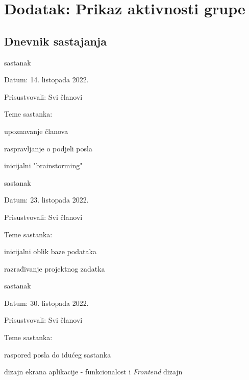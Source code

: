 \chapter*{Dodatak: Prikaz aktivnosti grupe}

		\section*{Dnevnik sastajanja}

		\begin{packed_enum}
			\item  sastanak
			\item[] \begin{packed_item}
				\item Datum: 14. listopada 2022.
				\item Prisustvovali: Svi članovi
				\item Teme sastanka:
				\begin{packed_item}
					\item  upoznavanje članova
					\item  raspravljanje o podjeli posla
					\item  inicijalni "brainstorming"
				\end{packed_item}
			\end{packed_item}

			\item  sastanak
			\item[] \begin{packed_item}
				\item Datum: 23. listopada 2022.
				\item Prisustvovali: Svi članovi
				\item Teme sastanka:
				\begin{packed_item}
					\item  inicijalni oblik baze podataka
					\item  razrađivanje projektnog zadatka
				\end{packed_item}
			\end{packed_item}

			\item  sastanak
			\item[] \begin{packed_item}
				\item Datum: 30. listopada 2022.
				\item Prisustvovali: Svi članovi
				\item Teme sastanka:
				\begin{packed_item}
					\item  raspored posla do idućeg sastanka
					\item  dizajn ekrana aplikacije - funkcionalost i \textit{Frontend} dizajn
				\end{packed_item}
			\end{packed_item}


\end{packed_enum}
